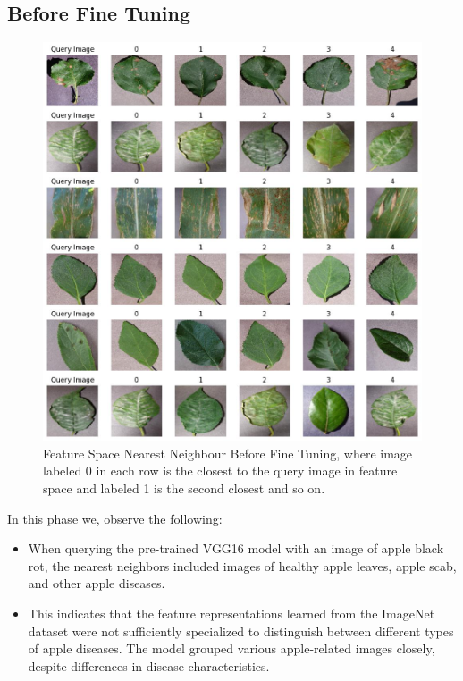 \subsection{Before Fine Tuning}
\begin{figure}
    \centering
    \includegraphics[width=1\linewidth]{graphics//chapter7/query image bft.png}
    \caption{Feature Space Nearest Neighbour Before Fine Tuning, where image labeled 0 in each row is the closest to the query image in feature space and labeled 1 is the second closest and so on.}
    \label{fig:query-bft}
\end{figure}

In this phase we, observe the following:
\begin{itemize}
    \item When querying the pre-trained VGG16 model with an image of apple black rot, the nearest neighbors included images of healthy apple leaves, apple scab, and other apple diseases.
    \item This indicates that the feature representations learned from the ImageNet dataset were not sufficiently specialized to distinguish between different types of apple diseases. The model grouped various apple-related images closely, despite differences in disease characteristics.
\end{itemize}


